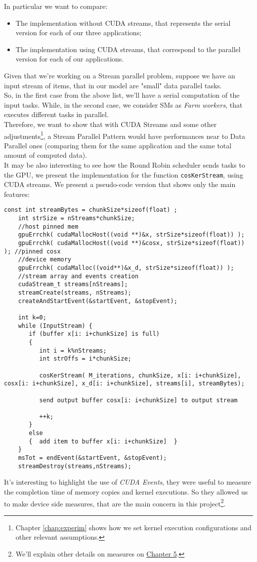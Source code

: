 	In particular we want to compare:
	\begin{itemize}
		\item The implementation without CUDA streams, that represents the serial version for each of our three applications;
		\item The implementation using CUDA streams, that correspond to the parallel version for each of our applications.
	\end{itemize}
	Given that we're working on a Stream parallel problem, suppose we have an input stream of items, that in our model are "small" data parallel tasks.\\
	So, in the first case from the above list, we'll have a serial computation of the input tasks.
	While, in the second case, we consider SMs as \textit{Farm workers}, that executes different tasks in parallel.\\
	Therefore, we want to show that with CUDA Streams and some other adjustments\footnote{Chapter \ref{chap:experim} shows how we set kernel execution configurations and other relevant assumptions.}, a Stream Parallel Pattern would have performances near to Data Parallel ones (comparing them for the same application and the same total amount of computed data).\\
	
	It may be also interesting to see how the Round Robin scheduler sends tasks to the GPU, we present the implementation for the function \texttt{cosKerStream}, using CUDA streams. We present a pseudo-code version that shows only the main features:
	\begin{lstlisting}[caption={Host side pseudo-code: input stream \& kernel call function(scheduler).}]
	const int streamBytes = chunkSize*sizeof(float) ;
	int strSize = nStreams*chunkSize;	
	//host pinned mem
	gpuErrchk( cudaMallocHost((void **)&x, strSize*sizeof(float)) ); 
	gpuErrchk( cudaMallocHost((void **)&cosx, strSize*sizeof(float)) ); //pinned cosx
	//device memory	
	gpuErrchk( cudaMalloc((void**)&x_d, strSize*sizeof(float)) );
	//stream array and events creation 
	cudaStream_t streams[nStreams];
	streamCreate(streams, nStreams);
	createAndStartEvent(&startEvent, &stopEvent);
	
	int k=0;
	while (InputStream) {  
	   if (buffer x[i: i+chunkSize] is full)
	   {
	      int i = k%nStreams;
	      int strOffs = i*chunkSize;
			
	      cosKerStream( M_iterations, chunkSize, x[i: i+chunkSize], cosx[i: i+chunkSize], x_d[i: i+chunkSize], streams[i], streamBytes);
	      
	      send output buffer cosx[i: i+chunkSize] to output stream
	      
	      ++k;
	   }
	   else
	   {  add item to buffer x[i: i+chunkSize]  }	
	} 
	msTot = endEvent(&startEvent, &stopEvent);
	streamDestroy(streams,nStreams); 	
	\end{lstlisting}
	It's interesting to highlight the use of \textit{CUDA Events}, they were useful to measure the completion time of memory copies and kernel executions. So they allowed us to make device side measures, that are the main concern in this project\footnote{We'll explain other details on measures on \hyperref[chap:experim]{Chapter 5}.}.
	
